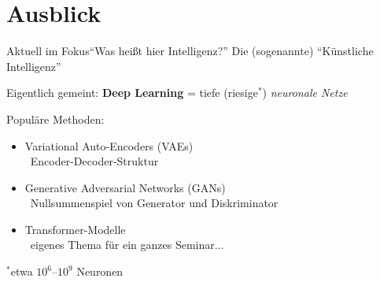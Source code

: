 \section{Ausblick}

\begin{frame}{Aktuell im Fokus}{\enquote{Was heißt hier Intelligenz?}}
	Die (sogenannte) \enquote{Künstliche Intelligenz} \warnSign
	\bigskip
	
	Eigentlich gemeint: \textbf{Deep Learning} = tiefe (riesige$^*$) \emph{neuronale Netze}
	\bigskip
	
	Populäre Methoden:
	\begin{itemize}
		\item Variational Auto-Encoders (VAEs)\\
			\qquad\conclude~Encoder-Decoder-Struktur
		\item Generative Adversarial Networks (GANs)\\
			\qquad\conclude~Nullsummenspiel von Generator und Diskriminator
		\item Transformer-Modelle\\
		\qquad\conclude~eigenes Thema für ein ganzes Seminar...
	\end{itemize}

	\vfill\hfill \footnotesize $^*$etwa $10^6$--$10^9$ Neuronen
\end{frame}

